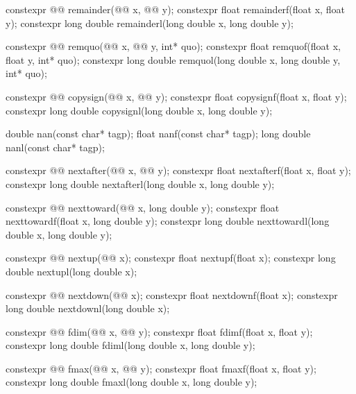 \begin{codeblock}
{  constexpr @@ remainder(@@ x, @@ y);
  constexpr float               remainderf(float x, float y);
  constexpr long double         remainderl(long double x, long double y);

  constexpr @@ remquo(@@ x, @@ y, int* quo);
  constexpr float               remquof(float x, float y, int* quo);
  constexpr long double         remquol(long double x, long double y, int* quo);

  constexpr @@ copysign(@@ x, @@ y);
  constexpr float               copysignf(float x, float y);
  constexpr long double         copysignl(long double x, long double y);

  double      nan(const char* tagp);
  float       nanf(const char* tagp);
  long double nanl(const char* tagp);

  constexpr @@ nextafter(@@ x, @@ y);
  constexpr float               nextafterf(float x, float y);
  constexpr long double         nextafterl(long double x, long double y);

  constexpr @@ nexttoward(@@ x, long double y);
  constexpr float               nexttowardf(float x, long double y);
  constexpr long double         nexttowardl(long double x, long double y);

  constexpr @@ nextup(@@ x);
  constexpr float               nextupf(float x);
  constexpr long double         nextupl(long double x);

  constexpr @@ nextdown(@@ x);
  constexpr float               nextdownf(float x);
  constexpr long double         nextdownl(long double x);

  constexpr @@ fdim(@@ x, @@ y);
  constexpr float               fdimf(float x, float y);
  constexpr long double         fdiml(long double x, long double y);

  constexpr @@ fmax(@@ x, @@ y);
  constexpr float               fmaxf(float x, float y);
  constexpr long double         fmaxl(long double x, long double y);

}
\end{codeblock}
